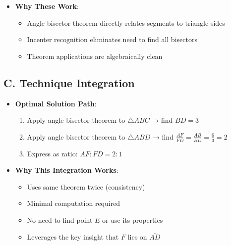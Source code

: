 \documentclass[12pt]{article}
\begin{document}
\begin{tacticalbox}
\begin{itemize}[leftmargin=*]
    \item \textbf{Why These Work}:
    \begin{itemize}
        \item Angle bisector theorem directly relates segments to triangle sides
        \item Incenter recognition eliminates need to find all bisectors
        \item Theorem applications are algebraically clean
    \end{itemize}
\end{itemize}

\subsection*{C. Technique Integration}
\begin{itemize}[leftmargin=*]
    \item \textbf{Optimal Solution Path}:
    \begin{enumerate}
        \item Apply angle bisector theorem to $\triangle ABC$ → find $BD = 3$
        \item Apply angle bisector theorem to $\triangle ABD$ → find $\frac{AF}{FD} = \frac{AB}{BD} = \frac{6}{3} = 2$
        \item Express as ratio: $AF : FD = 2 : 1$
    \end{enumerate}
    
    \item \textbf{Why This Integration Works}:
    \begin{itemize}
        \item Uses same theorem twice (consistency)
        \item Minimal computation required
        \item No need to find point $E$ or use its properties
        \item Leverages the key insight that $F$ lies on $\overline{AD}$
    \end{itemize}
\end{itemize}
\end{tacticalbox}
\end{document}
